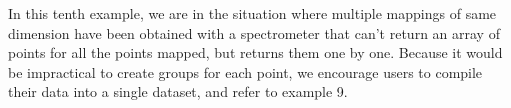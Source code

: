 In this tenth example, we are in the situation where multiple mappings of same dimension have been obtained with a spectrometer that can't return an array of points for all the points mapped, but returns them one by one. Because it would be impractical to create groups for each point, we encourage users to compile their data into a single dataset, and refer to example 9.